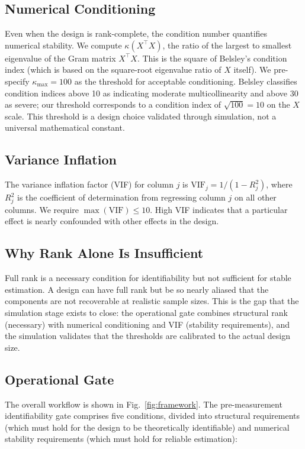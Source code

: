 \documentclass{ieeeaccess}
\theoremstyle{definition}
\theoremstyle{plain}
\begin{document}
\subsection{Numerical Conditioning}
Even when the design is rank-complete, the condition number quantifies numerical stability. We compute $\kappa(X^\top X)$, the ratio of the largest to smallest eigenvalue of the Gram matrix $X^\top X$. This is the square of Belsley's condition index (which is based on the square-root eigenvalue ratio of $X$ itself). We pre-specify $\kappa_{\max} = 100$ as the threshold for acceptable conditioning. Belsley classifies condition indices above 10 as indicating moderate multicollinearity and above 30 as severe; our threshold corresponds to a condition index of $\sqrt{100} = 10$ on the $X$ scale. This threshold is a design choice validated through simulation, not a universal mathematical constant.

\subsection{Variance Inflation}
The variance inflation factor (VIF) for column $j$ is $\text{VIF}_j = 1/(1 - R^2_j)$, where $R^2_j$ is the coefficient of determination from regressing column $j$ on all other columns. We require $\max(\text{VIF}) \leq 10$. High VIF indicates that a particular effect is nearly confounded with other effects in the design.

\subsection{Why Rank Alone Is Insufficient}
Full rank is a necessary condition for identifiability but not sufficient for stable estimation. A design can have full rank but be so nearly aliased that the components are not recoverable at realistic sample sizes. This is the gap that the simulation stage exists to close: the operational gate combines structural rank (necessary) with numerical conditioning and VIF (stability requirements), and the simulation validates that the thresholds are calibrated to the actual design size.

\subsection{Operational Gate}
The overall workflow is shown in Fig.~\ref{fig:framework}. The pre-measurement identifiability gate comprises five conditions, divided into structural requirements (which must hold for the design to be theoretically identifiable) and numerical stability requirements (which must hold for reliable estimation):
\end{document}
